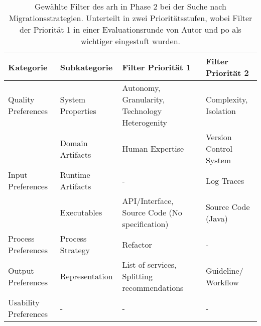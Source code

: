\begin{table}[!h]
  \centering
  \begin{tabular}{m{3cm} l m{4cm} m{3.5cm}}
    \hline
    \textbf{Kategorie} & \textbf{Subkategorie} & \textbf{Filter Priorität 1} & \textbf{Filter Priorität 2} \\ \hline
    Quality Preferences & System Properties & Autonomy, Granularity, Tech\-nology Heterogenity & Complexity, Isolation \\ \hline
    & Domain Artifacts & Human Expertise & Version Control Sys\-tem \\ 
    Input Preferences & Runtime Artifacts & - & Log Traces \\ 
     & Executables & API/Interface, Source Code (No specifica\-tion) & Source Code (Java) \\ \hline
    Process Preferences & Process Strategy & Refactor & - \\ \hline
    Output Preferences & Representation & List of services, Split\-ting recommendations & Guideline/ Workflow \\ \hline
    Usability Preferences & - & - & - \\ \hline
  \end{tabular}
  \caption[Gewählte Filter des \gls{arh} in Phase 2]{
    Gewählte Filter des \gls{arh} in Phase 2 bei der Suche nach Migrationsstrategien.
    Unterteilt in zwei Prioritätsstufen, wobei Filter der Priorität 1 in einer Evaluationsrunde von Autor und \gls{po} als wichtiger eingestuft wurden.
  }
  \label{tab:phase2-selected-filter}
\end{table}
